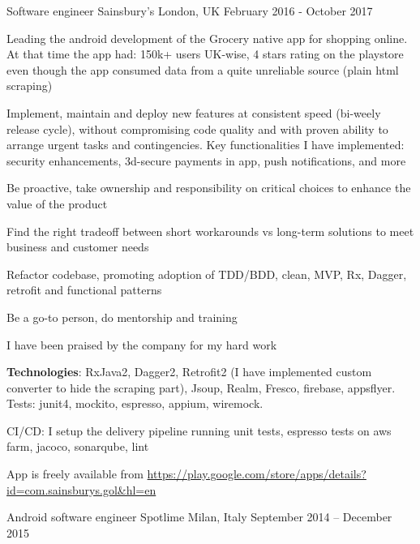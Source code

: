 \begin{cventries}
\cventry
	{Software engineer}
{Sainsbury's}
	{London, UK}
	{February 2016 - October 2017}
{%
\begin{cvitems} 
\item 
	Leading the android development of the Grocery 
   native app for shopping online. At that time the app had:
	150k+ users UK-wise, 4 stars rating on the playstore even though the app consumed data from a quite unreliable source (plain html scraping)
\item 
	Implement, maintain and deploy  
		new features at consistent speed (bi-weely release cycle), without compromising code quality and with proven ability to arrange urgent tasks and contingencies.
	 Key functionalities I have implemented: security enhancements, 3d-secure payments in app, push notifications, and more
	\item Be proactive, take ownership and responsibility on critical choices to enhance the value of the product
	\item Find the right tradeoff between 
		short workarounds vs long-term solutions to meet business and customer needs 
	\item Refactor codebase, promoting adoption of TDD/BDD, clean, MVP, Rx, Dagger, retrofit and functional patterns
    \item Be a go-to person, do mentorship and training
    \item 
    I have been praised by the company for my hard work
\item \textbf{Technologies}: 
    RxJava2, Dagger2, Retrofit2 (I have implemented custom converter to hide the scraping part), Jsoup,
    Realm,
   Fresco, firebase, appsflyer. Tests: junit4, mockito, espresso, appium, wiremock.
	\item  CI/CD: I setup the delivery pipeline running
		unit tests, espresso tests on aws farm, jacoco, sonarqube, lint
\item App is freely available from 
	\url{https://play.google.com/store/apps/details?id=com.sainsburys.gol&hl=en}
	\end{cvitems}
}
\cventry
{Android software engineer}
{Spotlime}
{Milan, Italy}
{September 2014 -- December 2015 }
{
	\begin{cvitems}

\end{cvitems}}
\end{cventries}
